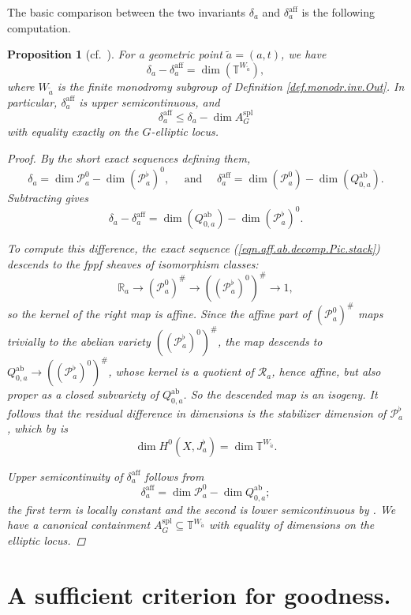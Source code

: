 \documentclass[openany]{amsbook}
\newtheorem{proposition}[theorem]{Proposition}
\theoremstyle{definition}
\theoremstyle{remark}
\numberwithin{equation}{section}
\newcommand{\R}{\mathbb{R}}
\newcommand{\T}{\mathbb{T}}
\newcommand{\cR}{\mathcal{R}}
\newcommand{\cP}{\mathcal{P}}
\renewcommand{\-}{\operatorname{-}}
\newcommand{\wtilde}[1]{\widetilde{#1}}
\newcommand{\spl}{\mathrm{spl}}
\newcommand{\aff}{\mathrm{aff}}
\newcommand{\ab}{\mathrm{ab}}
\begin{document}
The basic comparison between the two invariants $\delta_a$ and $\delta_a^{\aff}$ is the following computation.
\begin{proposition}[{{cf.\ \cite[10.5.1]{CLII}}}]\label{prop.delta.invs.comparison}
    For a geometric point $\wtilde{a} = (a,t)$, we have
    $$
        \delta_a - \delta_a^\aff = \dim(\T^{W_{\wtilde{a}}}),
    $$
    where $W_{\wtilde{a}}$ is the finite monodromy subgroup of Definition \ref{def.monodr.inv.Out}. In particular, $\delta_a^{\aff}$ is upper semicontinuous, and $$\delta_a^{\aff} \le \delta_a - \dim A_G^{\spl}$$ with equality exactly on the $G$-elliptic locus. 
    \begin{proof}
        By the short exact sequences defining them,
        $$
            \delta_a = \dim \cP_a^0 - \dim(\cP^\flat_a)^0, \quad \text{ and } \quad \delta_a^{\aff} = \dim(\cP_a^0) - \dim(Q^{\ab}_{0,a}).
        $$
        Subtracting gives
        $$
            \delta_a - \delta_a^{\aff} = \dim(Q^{\ab}_{0,a}) - \dim(\cP^\flat_a)^0.
        $$
        
        To compute this difference, the exact sequence (\ref{eqn.aff.ab.decomp.Pic.stack}) descends to the fppf sheaves of isomorphism classes:
        $$
            \R_a \to (\cP_a^0)^\# \to ((\cP_a^{\flat})^0)^\# \to 1,
        $$
        so the kernel of the right map is affine. Since the affine part of $(\cP_a^0)^\#$ maps trivially to the abelian variety $((\cP_a^{\flat})^0)^\#$, 
        the map descends to
        $Q_{0,a}^{\ab} \to ((\cP^{\flat}_a)^0)^\#$, whose kernel is a quotient of $\cR_a$, hence affine, but also proper as a closed subvariety of $Q_{0,a}^{\ab}$. So the descended map is an isogeny. It follows that the residual difference in dimensions is the stabilizer dimension of $\cP^{\flat}_a$, which by \cite[\S 4.11]{ngofl} is $$\dim H^0(X, J_a^{\flat}) = \dim \T^{W_{\wtilde{a}}}.$$ 
        
        Upper semicontinuity of $\delta_a^{\aff}$ follows from 
        $$\delta_a^{\aff} = \dim \cP_a^0 - \dim Q_{0,a}^{\ab};$$
        the first term is locally constant and the second is lower semicontinuous by \cite[Exp.\ X, Rem.\ 8.7]{SGAIII}. We have a canonical containment $A_G^{\spl} \subseteq \T^{W_{\wtilde{a}}}$ with equality of dimensions on the elliptic locus.
    \end{proof}
\end{proposition}

 



\section{A sufficient criterion for goodness.}
\end{document}
